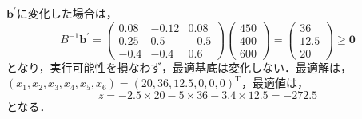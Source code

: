 \documentclass{jsreport}
\begin{document}
$\bm{b}^{\prime}$に変化した場合は，
\begin{equation}
  B^{-1}\bm{b}^{\prime} = \left(
  \begin{array}{ccc}
    0.08 & -0.12 & 0.08 \\
    0.25 & 0.5 & -0.5 \\
    -0.4 & -0.4 & 0.6
  \end{array}
  \right) \left(
  \begin{array}{c}
    450 \\
    400 \\
    600
  \end{array}
  \right) =
  \left(
  \begin{array}{c}
    36 \\
    12.5 \\
    20
  \end{array}
  \right) \geq \bm{0} \nonumber
\end{equation}
となり，実行可能性を損なわず，最適基底は変化しない．最適解は，$(x_1, x_2, x_3, x_4, x_5, x_6) = (20, 36, 12.5, 0, 0, 0)^{\mathrm{T}}$，最適値は，
\begin{equation}
  z = -2.5 \times 20 - 5 \times 36 - 3.4 \times 12.5 = -272.5 \nonumber
\end{equation}
となる．
\end{document}
